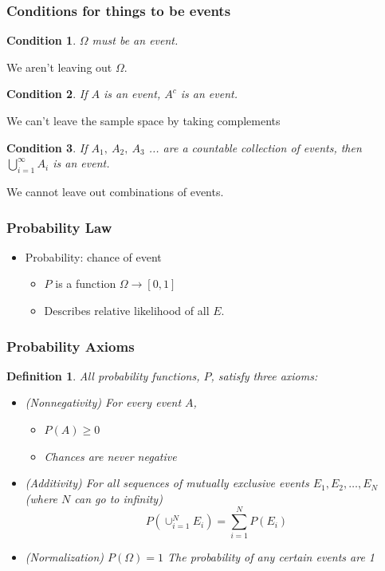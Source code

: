 \documentclass{beamer}
\newtheorem{condition}{Condition}
\newtheorem{defn}{Definition}
\numberwithin{equation}{section}
\begin{document}
\begin{frame}
\frametitle{Conditions for things to be events}


\begin{condition}
$\Omega$ must be an event. \\
\end{condition}

We aren't leaving out $\Omega$.

\begin{condition}
If $A$ is an event, $A^c$ is an event. \\
\end{condition}

We can't leave the sample space by taking complements

\begin{condition}
If $A_1,\ A_2,\ A_3$ ... are a countable collection of events, then $\bigcup_{i=1}^\infty A_i$ is an event. \\
\end{condition}

We cannot leave out combinations of events.

\end{frame}




\begin{frame}
\frametitle{Probability Law}

\begin{itemize}
\item \alert{Probability}: chance of event \pause 
\begin{itemize}
\item[-] $P$ is a function $\Omega \rightarrow [0,1]$\pause 
\item[-] Describes relative likelihood of all $E$.
\end{itemize}
\end{itemize}

\end{frame}

\begin{frame}
\frametitle{Probability Axioms} 


\begin{defn}
All probability functions, $P$, satisfy three axioms: \pause 
\begin{itemize}
\item[1)] (Nonnegativity) For every event $A$,  \pause 
\begin{itemize}
\item[] $P(A) \geq 0$  \pause 
\item[] Chances are never negative \pause 
\end{itemize}
\item[2)] (Additivity) For all sequences of mutually exclusive events $E_{1},  E_{2}, \hdots,E_{N} $ (where $N$ can go to infinity)\\ \pause 
$$P\left(\cup_{i=1}^{N} E_{i}  \right)  = \sum_{i=1}^{N} P(E_{i} ) $$
\item[3)] (Normalization) $P(\Omega) = 1$ \pause 
The probability of any certain events are 1 
\end{itemize}
\end{defn}
\end{frame}
\end{document}
